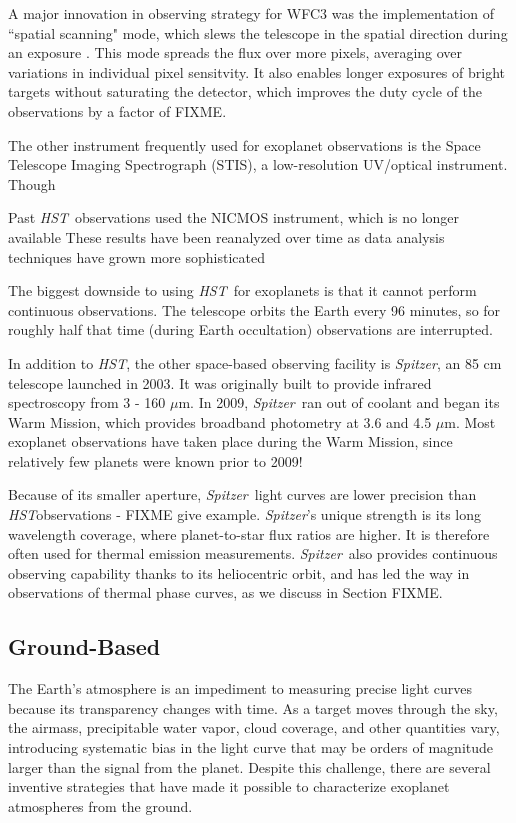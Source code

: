 \documentclass[graybox,natbib,nosecnum]{svmult}
\newcommand{\project}[1]{\textsl{#1}}
\newcommand{\HST}{\project{HST}}
\newcommand{\Spitzer}{\project{Spitzer}}
\begin{document}
A major innovation in observing strategy for WFC3 was the implementation of ``spatial scanning" mode, which slews the telescope in the spatial direction during an exposure \citep[first used by][]{deming13}. This mode spreads the flux over more pixels, averaging over variations in individual pixel sensitvity. It also enables longer exposures of bright targets without saturating the detector, which improves the duty cycle of the observations by a factor of FIXME.

The other instrument frequently used for exoplanet observations is the Space Telescope Imaging Spectrograph (STIS), a low-resolution UV/optical instrument. Though  

Past \HST\ observations used the NICMOS instrument, which is no longer available 
These results \citep{tinetti07, swain08} have been reanalyzed over time as data analysis techniques have grown more sophisticated \citep{gibson11}

The biggest downside to using \HST\ for exoplanets is that it cannot perform continuous observations. The telescope orbits the Earth every 96 minutes, so for roughly half that time (during Earth occultation) observations are interrupted. 

In addition to \HST, the other space-based observing facility is \Spitzer, an 85 cm telescope launched in 2003. It was originally built to provide infrared spectroscopy from 3 - 160 $\mu$m.  In 2009, \Spitzer\ ran out of coolant and began its Warm Mission, which provides broadband photometry at 3.6 and 4.5 $\mu$m.  Most exoplanet observations have taken place during the Warm Mission, since relatively few planets were known prior to 2009!

Because of its smaller aperture, \Spitzer\ light curves are lower precision than \HST observations - FIXME give example. \Spitzer's unique strength is its long wavelength coverage, where planet-to-star flux ratios are higher. It is therefore often used for thermal emission measurements. \Spitzer\ also provides continuous observing capability thanks to its heliocentric orbit, and has led the way in observations of thermal phase curves, as we discuss in Section FIXME. 


\subsection{Ground-Based}
The Earth's atmosphere is an impediment to measuring precise light curves because its transparency changes with time.  As a target moves through the sky, the airmass, precipitable water vapor, cloud coverage, and other quantities vary, introducing systematic bias in the light curve that may be orders of magnitude larger than the signal from the planet. Despite this challenge, there are several inventive strategies that have made it possible to characterize exoplanet atmospheres from the ground. 
\end{document}
